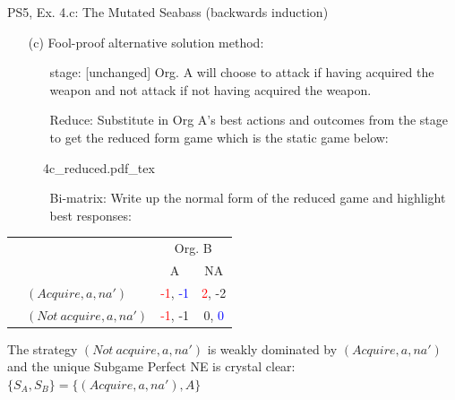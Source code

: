 \begin{frame}{PS5, Ex. 4.c: The Mutated Seabass (backwards induction)}
    \begin{itemize}
      \item[(c)] Fool-proof alternative solution method:
      \begin{itemize}\normalsize
        \item[\nth{3} stage:] [unchanged] Org. A will choose to attack if having acquired the weapon and not attack if not having acquired the weapon.
        \item[Reduce:] Substitute in Org A's best actions and outcomes from the  stage to get the reduced form game which is the static game below:
      \end{itemize}
    \end{itemize}
    \vspace{-6pt}
    \begin{figure}[!h]
      \center
      \def\svgwidth{.8\columnwidth}
      {4c_reduced.pdf_tex}
    \end{figure}
    \vspace{-4pt}
    \begin{itemize}
      \item[]
      \begin{itemize}\normalsize
        \item[Bi-matrix:] Write up the normal form of the reduced game and highlight best responses:
      \end{itemize}
    \end{itemize}
    \vspace{-8pt}
    \begin{table}
      \begin{tabular}{cl|c|c|}
        & \multicolumn{1}{c}{} & \multicolumn{2}{c}{\color{blue}Org. B}\\
        & \multicolumn{1}{c}{} & \multicolumn{1}{c}{A} & \multicolumn{1}{c}{NA} \\\cline{3-4}
        \parbox[t]{1mm}{}
        & $(Acquire, a, na')$ & \textcolor{red}{-1}, \textcolor{blue}{-1} & \textcolor{red}{2}, -2 \\
        & $(Not\ acquire, a, na')$ & \textcolor{red}{-1}, -1 & 0, \textcolor{blue}{0} \\
      \end{tabular}
    \end{table}
    \vspace{-2pt}
    The strategy $(Not\ acquire, a, na')$ is weakly dominated by $(Acquire, a, na')$ and the unique Subgame Perfect NE is crystal clear: $\{S_A,S_B\}=\{(Acquire, a, na'),A\}$
    \vfill\null
\end{frame}



